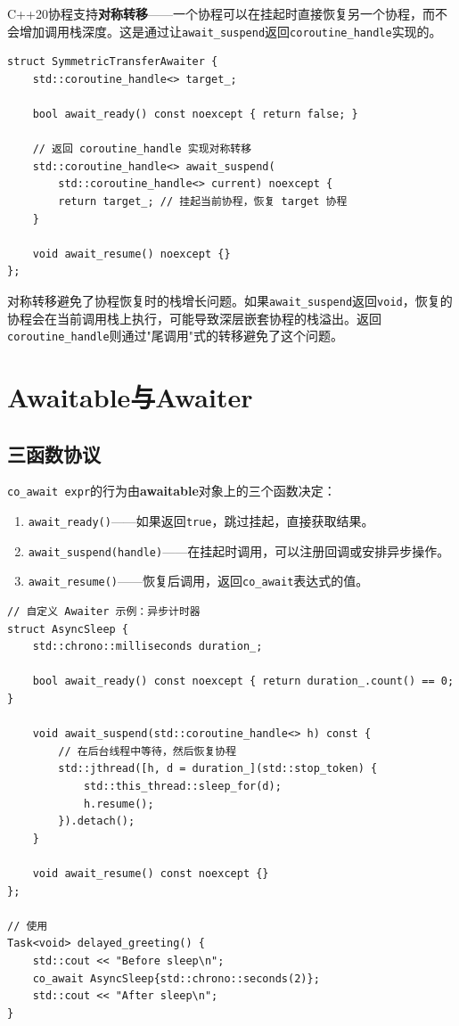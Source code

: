 \documentclass[12pt,a4paper,fontset=fandol]{ctexbook}
\newcommand{\cpp}[1]{C++#1}
\begin{document}
\cpp{}20协程支持\textbf{对称转移}——一个协程可以在挂起时直接恢复另一个协程，而不会增加调用栈深度。这是通过让\texttt{await\_suspend}返回\texttt{coroutine\_handle}实现的。

\begin{lstlisting}
struct SymmetricTransferAwaiter {
    std::coroutine_handle<> target_;

    bool await_ready() const noexcept { return false; }

    // 返回 coroutine_handle 实现对称转移
    std::coroutine_handle<> await_suspend(
        std::coroutine_handle<> current) noexcept {
        return target_; // 挂起当前协程，恢复 target 协程
    }

    void await_resume() noexcept {}
};
\end{lstlisting}

\begin{note}
对称转移避免了协程恢复时的栈增长问题。如果\texttt{await\_suspend}返回\texttt{void}，恢复的协程会在当前调用栈上执行，可能导致深层嵌套协程的栈溢出。返回\texttt{coroutine\_handle}则通过"尾调用"式的转移避免了这个问题。
\end{note}

\chapter{Awaitable与Awaiter}

\section{三函数协议}

\texttt{co\_await expr}的行为由\textbf{awaitable}对象上的三个函数决定：

\begin{enumerate}[nosep]
\item \texttt{await\_ready()}——如果返回\texttt{true}，跳过挂起，直接获取结果。
\item \texttt{await\_suspend(handle)}——在挂起时调用，可以注册回调或安排异步操作。
\item \texttt{await\_resume()}——恢复后调用，返回\texttt{co\_await}表达式的值。
\end{enumerate}

\begin{lstlisting}
// 自定义 Awaiter 示例：异步计时器
struct AsyncSleep {
    std::chrono::milliseconds duration_;

    bool await_ready() const noexcept { return duration_.count() == 0; }

    void await_suspend(std::coroutine_handle<> h) const {
        // 在后台线程中等待，然后恢复协程
        std::jthread([h, d = duration_](std::stop_token) {
            std::this_thread::sleep_for(d);
            h.resume();
        }).detach();
    }

    void await_resume() const noexcept {}
};

// 使用
Task<void> delayed_greeting() {
    std::cout << "Before sleep\n";
    co_await AsyncSleep{std::chrono::seconds(2)};
    std::cout << "After sleep\n";
}
\end{lstlisting}
\end{document}
